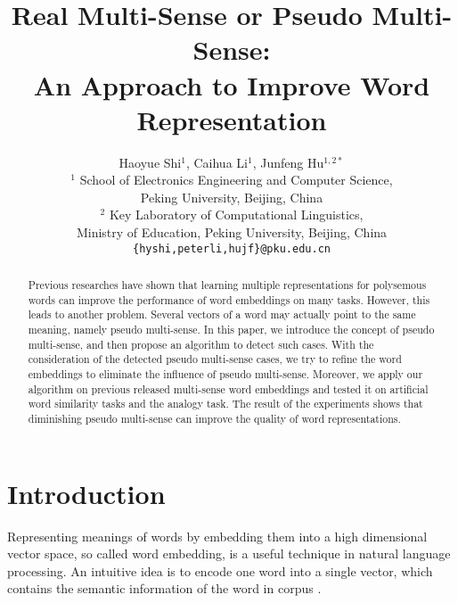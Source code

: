 \documentclass[11pt]{article}
\title{Real Multi-Sense or Pseudo Multi-Sense: \\An Approach to Improve Word Representation}
\author{Haoyue Shi$^1$, Caihua Li$^1$, Junfeng Hu$^{1,2*}$ \\
$^1$ School of Electronics Engineering and Computer Science, \\ Peking University, Beijing, China \\
$^2$ Key Laboratory of Computational Linguistics,\\ Ministry of Education, Peking University, Beijing, China\\
{\tt \{hyshi,peterli,hujf\}@pku.edu.cn}}
\date{}
\begin{document}
\maketitle
\begin{abstract}
Previous researches have shown that learning multiple representations for polysemous words can improve the performance of word embeddings on many tasks. However, this leads to another problem. Several vectors of a word may actually point to the same meaning, namely pseudo multi-sense. In this paper, we introduce the concept of pseudo multi-sense, and then propose an algorithm to detect such cases. With the consideration of the detected pseudo multi-sense cases, we try to refine the word embeddings to eliminate the influence of pseudo multi-sense. Moreover, we apply our algorithm on previous released multi-sense word embeddings and tested it on artificial word similarity tasks and the analogy task. The result of the experiments shows that diminishing pseudo multi-sense can improve the quality of word representations. 
\end{abstract}

\section{Introduction}

\par
Representing meanings of words by embedding them into a high dimensional vector space, so called word embedding, is a useful technique in natural language processing. An intuitive idea is to encode one word into a single vector, which contains the semantic information of the word in corpus \cite{bengio2003neural, collobert2008unified, mnih2007three, mikolov2010recurrent}.
\end{document}
